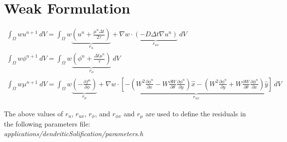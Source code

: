 \documentclass[10pt]{article}
\begin{document}
\section{Weak Formulation}

\begin{gather}
\int_{\Omega}   w  u^{n+1}  ~dV = \int_{\Omega}   w \underbrace{\left(u^{n} + \frac{\mu^n \Delta t}{2 \tau}\right)}_{r_u} + \nabla w \cdot \underbrace{(-D \Delta t \nabla u^n)}_{r_{ux}} ~dV \\
\int_{\Omega}   w  \phi^{n+1}  ~dV = \int_{\Omega}   w \underbrace{\left(\phi^n + \frac{\Delta t \mu^n}{\tau}\right)}_{r_{\phi}} ~dV \\
\int_{\Omega}   w  \mu^{n+1}  ~dV = \int_{\Omega}   w \underbrace{\left(-\frac{\partial f^n}{\partial \phi}\right)}_{r_{\mu}} + \nabla w \cdot \underbrace{\left[-\left(W^2 \frac{\partial \phi^n}{\partial x} - W \frac{\partial W}{\partial \theta} \frac{\partial \phi^n}{\partial y}\right)\hat{x}  - \left(W^2 \frac{\partial \phi^n}{\partial y} + W \frac{\partial W}{\partial \theta} \frac{\partial \phi^n}{\partial x}\right) \hat{y} \right]}_{r_{\phi x}}  ~dV 
\end{gather}






\vskip 0.25in
The above values of $r_{u}$, $r_{ux}$, $r_{\phi}$, and $r_{\phi x}$ and $r_{\mu}$ are used to define the residuals in the following parameters file: \\
\textit{applications/dendriticSolification/parameters.h}
\end{document}
